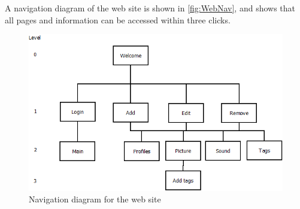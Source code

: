 A navigation diagram of the web site is shown in \autoref{fig:WebNav}, and shows that all pages and information can be accessed within three clicks.

\begin{figure}
	\centering
		\includegraphics{images/WebNav.png}
	\caption{Navigation diagram for the web site}
	\label{fig:WebNav}
\end{figure}

